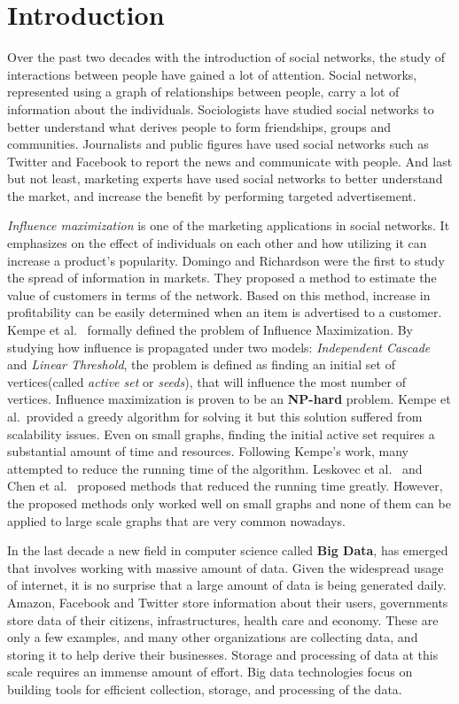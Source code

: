 \documentclass[english]{tktltiki}
\begin{document}
\mytableofcontents
\section{Introduction}
Over the past two decades with the introduction of social networks, the study of interactions between people have gained a lot of attention.
Social networks, represented using a graph of relationships between people, carry a lot of information about the individuals. 
Sociologists have studied social networks to better understand what derives people to form friendships, groups and communities.
Journalists and public figures have used social networks such as Twitter and Facebook to report the news and communicate with people. 
And last but not least, marketing experts have used social networks to better understand the market, and increase the benefit by performing targeted advertisement.

\textit{Influence maximization} is one of the marketing applications in social networks. 
It emphasizes on the effect of individuals on each other and how utilizing it can increase a product's popularity. 
Domingo and Richardson \cite{domingo01} were the first to study the spread of information in markets. 
They proposed a method to estimate the value of customers in terms of the network.
Based on this method, increase in profitability can be easily determined when an item is advertised to a customer.
Kempe et al.\ \cite{kempe03} formally defined the problem of Influence Maximization.
By studying how influence is propagated under two models: \textit{Independent Cascade} and \textit{Linear Threshold}, the problem is defined as finding an initial set of vertices(called \textit{active set} or \textit{seeds}), that will influence the most number of vertices.
Influence maximization is proven to be an \textbf{NP-hard} problem. 
Kempe et al.\ provided a greedy algorithm for solving it but this solution suffered from scalability issues. 
Even on small graphs, finding the initial active set requires a substantial amount of time and resources.
Following Kempe's work, many attempted to reduce the running time of the algorithm. 
Leskovec et al.\ \cite{leskovec07} and Chen et al.\ \cite{chen09} proposed methods that reduced the running time greatly. 
However, the proposed methods only worked well on small graphs and none of them can be applied to large scale graphs that are very common nowadays.

In the last decade a new field in computer science called \textbf{Big Data}, has emerged that involves working with massive amount of data. 
Given the widespread usage of internet, it is no surprise that a large amount of data is being generated daily. 
Amazon, Facebook and Twitter store information about their users, governments store data of their citizens, infrastructures, health care and economy. 
These are only a few examples, and many other organizations are collecting data, and storing it to help derive their businesses.
Storage and processing of data at this scale requires an immense amount of effort. 
Big data technologies focus on building tools for efficient collection, storage, and processing of the data. 
\end{document}
